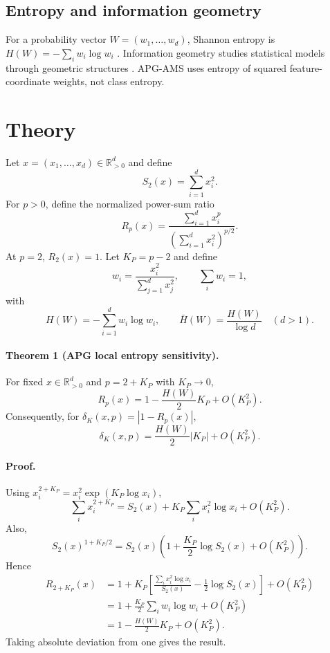 \documentclass[11pt]{article}
\begin{document}
\subsection{Entropy and information geometry}
For a probability vector $W=(w_1,\ldots,w_d)$, Shannon entropy is $H(W)=-\sum_i w_i\log w_i$ \cite{shannon1948,coverthomas2006}. Information geometry studies statistical models through geometric structures \cite{amari2016,nielsen2020}. APG-AMS uses entropy of squared feature-coordinate weights, not class entropy.

\section{Theory}
Let $x=(x_1,\ldots,x_d)\in\mathbb{R}_{>0}^d$ and define
\begin{equation}
S_2(x)=\sum_{i=1}^d x_i^2.
\end{equation}
For $p>0$, define the normalized power-sum ratio
\begin{equation}
R_p(x)=\frac{\sum_{i=1}^d x_i^p}{\left(\sum_{i=1}^d x_i^2\right)^{p/2}}.
\end{equation}
At $p=2$, $R_2(x)=1$. Let $K_P=p-2$ and define
\begin{equation}
w_i=\frac{x_i^2}{\sum_{j=1}^d x_j^2},\qquad \sum_i w_i=1,
\end{equation}
with
\begin{equation}
H(W)=-\sum_{i=1}^d w_i\log w_i,
\qquad
\bar H(W)=\frac{H(W)}{\log d}\quad(d>1).
\end{equation}

\paragraph{Theorem 1 (APG local entropy sensitivity).}
For fixed $x\in\mathbb{R}_{>0}^d$ and $p=2+K_P$ with $K_P\to0$,
\begin{equation}
R_p(x)=1-\frac{H(W)}{2}K_P+O(K_P^2).
\end{equation}
Consequently, for $\delta_K(x,p)=|1-R_p(x)|$,
\begin{equation}
\delta_K(x,p)=\frac{H(W)}{2}|K_P|+O(K_P^2).
\end{equation}

\paragraph{Proof.}
Using $x_i^{2+K_P}=x_i^2\exp(K_P\log x_i)$,
\begin{equation}
\sum_i x_i^{2+K_P}
=S_2(x)+K_P\sum_i x_i^2\log x_i+O(K_P^2).
\end{equation}
Also,
\begin{equation}
S_2(x)^{1+K_P/2}
=S_2(x)\left(1+\frac{K_P}{2}\log S_2(x)+O(K_P^2)\right).
\end{equation}
Hence
\begin{align}
R_{2+K_P}(x)
&=1+K_P\left[
\frac{\sum_i x_i^2\log x_i}{S_2(x)}
-\frac12\log S_2(x)\right]+O(K_P^2)\\
&=1+\frac{K_P}{2}\sum_i w_i\log w_i+O(K_P^2)\\
&=1-\frac{H(W)}{2}K_P+O(K_P^2).
\end{align}
Taking absolute deviation from one gives the result.
\end{document}

